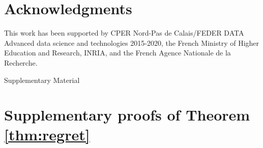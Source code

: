 \documentclass[runningheads, envcountsame, a4paper]{llncs}
\begin{document}
\section*{Acknowledgments}
This work has been supported by CPER Nord-Pas de Calais/FEDER DATA Advanced data science and technologies 2015-2020, the French Ministry of Higher Education and Research, INRIA, and the French Agence Nationale de la Recherche.




\newpage
\appendix
\begin{center}
    \Large Supplementary Material
\end{center}

%
%
%
%

\section{Supplementary proofs of Theorem \ref{thm:regret}}
\end{document}
